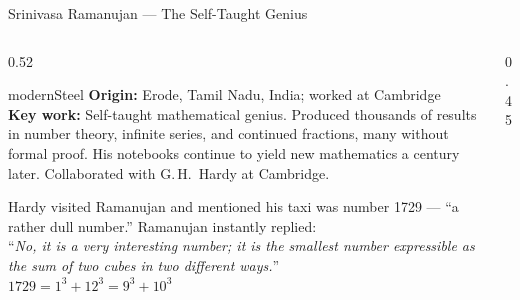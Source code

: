 \begin{frame}[shrink=25]{Srinivasa Ramanujan --- The Self-Taught Genius}

  \begin{columns}[T]
    \begin{column}{0.52\textwidth}
      \begin{personbox}{modernSteel}
        \textbf{Origin:} Erode, Tamil Nadu, India; worked at Cambridge\\[3pt]
        \textbf{Key work:} Self-taught mathematical genius. Produced thousands
        of results in number theory, infinite series, and continued fractions,
        many without formal proof. His notebooks continue to yield new
        mathematics a century later. Collaborated with G.\,H.~Hardy
        at Cambridge.
      \end{personbox}

      \vspace{0.4em}
      \begin{tcolorbox}[colback=modernSteel!5, colframe=modernSteel!50,
        fonttitle=\bfseries\small, title={The Taxicab Number}, rounded corners,
        boxrule=0.5pt, left=3pt, right=3pt, top=2pt, bottom=2pt]
        \small
        Hardy visited Ramanujan and mentioned his taxi was number 1729 ---
        ``a rather dull number.'' Ramanujan instantly replied:\\[2pt]
        ``\emph{No, it is a very interesting number; it is the smallest
        number expressible as the sum of two cubes in two different ways.}''\\[2pt]
        $1729 = 1^3 + 12^3 = 9^3 + 10^3$
      \end{tcolorbox}
    \end{column}

    \begin{column}{0.45\textwidth}

      \vspace{0.5em}
    \end{column}
  \end{columns}

\end{frame}

